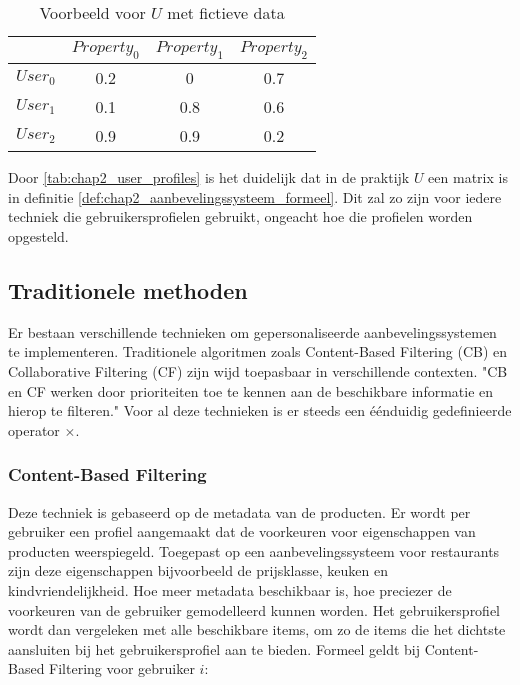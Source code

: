 \begin{table}[H]
\centering
\begin{tabular}{c|ccc}
         & $Property_0$ & $Property_1$ & $Property_2$ \\ \hline
$User_0$ & 0.2          & 0            & 0.7          \\
$User_1$ & 0.1          & 0.8          & 0.6          \\
$User_2$ & 0.9          & 0.9          & 0.2         
\end{tabular}
\caption{Voorbeeld voor $U$ met fictieve data}
\label{tab:chap2_user_profiles}
\end{table}

Door \autoref{tab:chap2_user_profiles} is het duidelijk dat in de praktijk $U$ een matrix is in definitie \ref{def:chap2_aanbevelingssysteem_formeel}. Dit zal zo zijn voor iedere techniek die gebruikersprofielen gebruikt, ongeacht hoe die profielen worden opgesteld.

\subsection{Traditionele methoden}
\label{sec:chapt2_traditionele_methoden}
Er bestaan verschillende technieken om gepersonaliseerde aanbevelingssystemen te implementeren. Traditionele algoritmen zoals Content-Based Filtering (CB) en Collaborative Filtering (CF) zijn wijd toepasbaar in verschillende contexten. "CB en CF werken door prioriteiten toe te kennen aan de beschikbare informatie en hierop te filteren." \cite{overzicht_technieken} Voor al deze technieken is er steeds een éénduidig gedefinieerde operator $\times$.


\subsubsection{Content-Based Filtering}
\label{seq:chapt2_cb}
Deze techniek is gebaseerd op de metadata van de producten. Er wordt per gebruiker een profiel aangemaakt dat de voorkeuren voor eigenschappen van producten weerspiegeld. Toegepast op een aanbevelingssysteem voor restaurants zijn deze eigenschappen bijvoorbeeld de prijsklasse, keuken en kindvriendelijkheid. Hoe meer metadata beschikbaar is, hoe preciezer de voorkeuren van de gebruiker gemodelleerd kunnen worden. Het gebruikersprofiel wordt dan vergeleken met alle beschikbare items, om zo de items die het dichtste aansluiten bij het gebruikersprofiel aan te bieden. Formeel geldt bij Content-Based Filtering voor gebruiker $i$:


